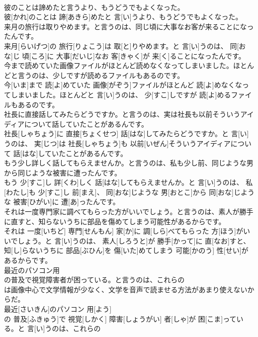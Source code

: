 \documentclass[8pt]{extreport}
\begin{document}
\begin{CJK}{UTF8}{min}
\\	彼のことは諦めたと言うより、もうどうでもよくなった。	
\\	彼[かれ]のことは 諦[あきら]めたと 言[い]うより、もうどうでもよくなった。
\\	来月の旅行は取りやめます。と言うのは、同じ頃に大事なお客が来ることになったんです。	
\\	来月[らいげつ]の 旅行[りょこう]は 取[と]りやめます。と 言[い]うのは、 同[おな]じ 頃[ころ]に 大事[だいじ]なお 客[きゃく]が 来[く]ることになったんです。
\\	今まで読めていた画像ファイルがほとんど読めなくなってしまいました。ほとんどと言うのは、少しですが読めるファイルもあるのです。	
\\	今[いま]まで 読[よ]めていた 画像[がぞう]ファイルがほとんど 読[よ]めなくなってしまいました。ほとんどと 言[い]うのは、 少[すこ]しですが 読[よ]めるファイルもあるのです。
\\	社長に直接話してみたらどうですか。と言うのは、実は社長も以前そういうアイディアについて話していたことがあるんです。	
\\	社長[しゃちょう]に 直接[ちょくせつ] 話[はな]してみたらどうですか。と 言[い]うのは、 実[じつ]は 社長[しゃちょう]も 以前[いぜん]そういうアイディアについて 話[はな]していたことがあるんです。
\\	もう少し詳しく話してもらえませんか。と言うのは、私も少し前、同じような男から同じような被害に遭ったんです。	
\\	もう 少[すこ]し 詳[くわ]しく 話[はな]してもらえませんか。と 言[い]うのは、 私[わたし]も 少[すこ]し 前[まえ]、 同[おな]じような 男[おとこ]から 同[おな]じような 被害[ひがい]に 遭[あ]ったんです。
\\	それは一度専門家に調べてもらった方がいいでしょう。と言うのは、素人が勝手に直すと、知らないうちに部品を傷めてしまう可能性があるからです。	
\\	それは 一度[いちど] 専門[せんもん] 家[か]に 調[しら]べてもらった 方[ほう]がいいでしょう。と 言[い]うのは、 素人[しろうと]が 勝手[かって]に 直[なお]すと、 知[し]らないうちに 部品[ぶひん]を 傷[いた]めてしまう 可能[かのう] 性[せい]があるからです。
\\	最近のパソコン用
\\	の普及で視覚障害者が困っている。と言うのは、これらの
\\	は画像中心で文学情報が少なく、文学を音声で読ませる方法があまり使えないからだ。	
\\	最近[さいきん]のパソコン 用[よう] 
\\	の 普及[ふきゅう]で 視覚[しかく] 障害[しょうがい] 者[しゃ]が 困[こま]っている。と 言[い]うのは、これらの 

\end{CJK}
\end{document}
